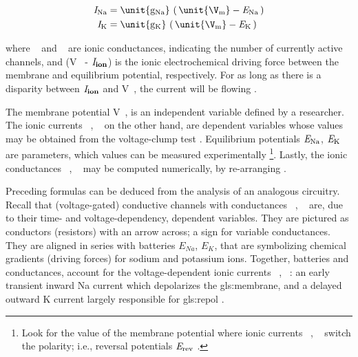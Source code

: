 \documentclass[class={myRUCProject}, crop=false]{standalone}
\begin{document}
\begin{align}
    \curr\sodium &= \unit{\cond\sodium} \, \br{\unit{\V\membrane} - \equi\sodium}\label{eq:sodiumCurrent}\\
    \curr\potassium &= \unit{\cond\potassium} \, \br{\unit{\V\membrane} - \equi\potassium}\label{eq:potassiumCurrent}
\end{align}

where \unit{\cond\sodium} and \unit{\cond\potassium} are ionic conductances, indicating the number of currently active channels, and (\unit{\V\membrane} - \(\mathit{I}_\mathbf{ion}\)) is the ionic electrochemical driving force between the membrane and equilibrium potential, respectively. For as long as there is a disparity between \(\mathit{I}_\mathbf{ion}\) and \unit{\V\membrane}, the current will be flowing \cite{wood1996neuroscience}. 


The membrane potential \unit{\V\membrane}, is an independent variable defined by a researcher. The ionic currents \unit{\curr\sodium}, \unit{\curr\potassium} on the other hand, are dependent variables whose values may be obtained from the voltage-clump test \cite{kandel2000principles}. Equilibrium potentials \(\mathit{E}_\mathrm{Na}\), \(\mathit{E}_\mathrm{K}\) are parameters, which values can be measured experimentally 
\cite{kandel2000principles}\footnote{Look for the value of the membrane potential where ionic currents \unit{\curr\sodium}, \unit{\curr\potassium} switch the polarity; i.e., reversal potentials \(\mathit{E}_\mathrm{rev}\) \cite{kandel2000principles}.}.
Lastly, the ionic conductances \unit{\cond\sodium}, \unit{\cond\potassium} may be computed numerically, by re-arranging . 



Preceding formulas  can be deduced from the analysis of an analogous circuitry. Recall that (voltage-gated) conductive channels with conductances \unit{\cond\sodium}, \unit{\cond\potassium} are, due to their time- and voltage-dependency, dependent variables. They are pictured as conductors (resistors) with an arrow across; a sign for variable conductances. They are aligned in series with batteries $E_{Na}$, $E_{K}$, that are symbolizing chemical gradients (driving forces) for sodium and potassium ions. Together, batteries and conductances, account for the voltage-dependent ionic currents \unit{\curr\sodium}, \unit{\curr\potassium}: an early transient inward \gls{Na} current which depolarizes the \gls{gls:membrane}, and a delayed outward \gls{K} current largely responsible for \gls{gls:repol} \cite{HodHux1952} \cite{kandel2000principles}.
\end{document}
